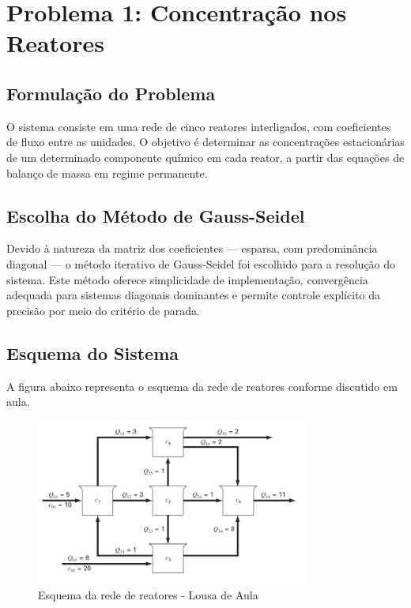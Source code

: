 \documentclass[12pt]{article}
\begin{document}
\section{Problema 1: Concentração nos Reatores}

\subsection{Formulação do Problema}

O sistema consiste em uma rede de cinco reatores interligados, com coeficientes de fluxo entre as unidades. O objetivo é determinar as concentrações estacionárias de um determinado componente químico em cada reator, a partir das equações de balanço de massa em regime permanente.

\subsection{Escolha do Método de Gauss-Seidel}

Devido à natureza da matriz dos coeficientes — esparsa, com predominância diagonal — o método iterativo de Gauss-Seidel foi escolhido para a resolução do sistema. Este método oferece simplicidade de implementação, convergência adequada para sistemas diagonais dominantes e permite controle explícito da precisão por meio do critério de parada.

\subsection{Esquema do Sistema}

A figura abaixo representa o esquema da rede de reatores conforme discutido em aula.

\begin{figure}[H]
    \centering
    \includegraphics[width=0.8\textwidth]{img/figure1.png}
    \caption{Esquema da rede de reatores - Lousa de Aula}
\end{figure}
\end{document}
